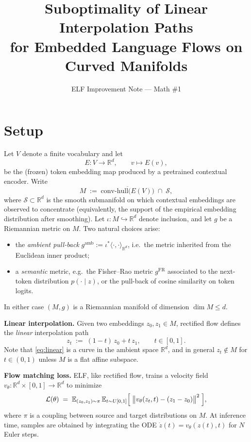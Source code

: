 \documentclass[11pt]{article}
\title{Suboptimality of Linear Interpolation Paths\\
for Embedded Language Flows on Curved Manifolds}
\author{ELF Improvement Note --- Math \#1}
\date{}
\begin{document}
\maketitle

\section*{Setup}

Let $V$ denote a finite vocabulary and let
\[
  E : V \longrightarrow \mathbb{R}^d, \qquad v \mapsto E(v),
\]
be the (frozen) token embedding map produced by a pretrained contextual
encoder. Write
\[
  M \;:=\; \overline{\mathrm{conv\text{-}hull}\bigl(E(V)\bigr)} \;\cap\; \mathcal{S},
\]
where $\mathcal{S} \subset \mathbb{R}^{d}$ is the smooth submanifold on
which contextual embeddings are observed to concentrate
(equivalently, the support of the empirical embedding distribution
after smoothing). Let $\iota : M \hookrightarrow \mathbb{R}^d$ denote
inclusion, and let $g$ be a Riemannian metric on $M$. Two natural
choices arise:
\begin{itemize}
  \item the \emph{ambient pull-back}
        $g^{\mathrm{amb}} := \iota^{\ast}\langle\cdot,\cdot\rangle_{\mathbb{R}^d}$,
        i.e.\ the metric inherited from the Euclidean inner product;
  \item a \emph{semantic} metric, e.g.\ the Fisher--Rao metric
        $g^{\mathrm{FR}}$ associated to the next-token distribution
        $p(\cdot \mid z)$, or the pull-back of cosine similarity on
        token logits.
\end{itemize}
In either case $(M, g)$ is a Riemannian manifold of dimension
$\dim M \le d$.

\medskip
\noindent\textbf{Linear interpolation.}
Given two embeddings $z_0, z_1 \in M$, rectified flow defines the
\emph{linear} interpolation path
\begin{equation}\label{eq:linear}
  z_t \;:=\; (1-t)\, z_0 + t\, z_1, \qquad t \in [0,1].
\end{equation}
Note that \eqref{eq:linear} is a curve in the ambient space
$\mathbb{R}^d$, and in general $z_t \notin M$ for $t \in (0,1)$
unless $M$ is a flat affine subspace.

\medskip
\noindent\textbf{Flow matching loss.}
ELF, like rectified flow, trains a velocity field
$v_\theta : \mathbb{R}^d \times [0,1] \to \mathbb{R}^d$ to minimize
\begin{equation}\label{eq:fm-loss}
  \mathcal{L}(\theta)
  \;=\;
  \mathbb{E}_{(z_0,z_1)\sim \pi}\,\mathbb{E}_{t\sim U[0,1]}
  \Bigl[\;\bigl\| v_\theta(z_t, t) - (z_1 - z_0) \bigr\|^{2}\;\Bigr],
\end{equation}
where $\pi$ is a coupling between source and target distributions
on $M$. At inference time, samples are obtained by integrating the
ODE $\dot z(t) = v_\theta(z(t), t)$ for $N$ Euler steps.
\end{document}
